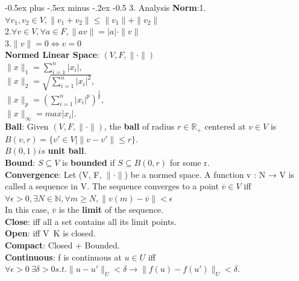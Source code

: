 \documentclass[10pt,landscape]{article}
\makeatletter
\renewcommand{\section}{\@startsection{section}{1}{0mm}%
                                {-0.5ex plus -.5ex minus -.2ex}%
                                {-0.5\baselineskip}%
                                {\normalfont\small\bfseries}}
\makeatother
\begin{document}
\begin{multicols*}{4}
\section{3. Analysis}
\textbf{Norm}:1.$\forall v_1,v_2 \in V, \parallel v_1+v_2 \parallel \leq \parallel v_1 \parallel + \parallel v_2 \parallel$\\
2.$\forall v \in V, \forall a \in F, \parallel av \parallel =|a| \cdot \parallel v \parallel$\\
3.$\parallel v \parallel = 0 \Leftrightarrow v=0$\\
\textbf{Normed Linear Space}: $(V,F,\parallel \cdot \parallel)$\\
$\parallel x \parallel_1 = \sum_{i=1}^{n} |x_i|,$\\
$\parallel x \parallel_2 = \sqrt{\sum_{i=1}^{n} |x_i|^2},$\\
$\parallel x \parallel_p = (\sum_{i=1}^{n} |x_i|^p)^{\frac{1}{p}},$\\
$\parallel x \parallel_\infty = max |x_i|.$\\

\textbf{Ball}: Given $(V,F,\parallel \cdot \parallel)$, the \textbf{ball} of radius $r \in \mathbb{R}_+$ centered at $v \in V$ is $B(v,r) = \{ v' \in V | \parallel v - v' \parallel \leq r\}$.\\
$B(0,1) is$ \textbf{unit ball}.\\
\textbf{Bound}: $S \subseteq V$ is \textbf{bounded} if $S \subseteq B(0,r)$ for some r.\\
\textbf{Convergence}: Let (V, F, $\parallel \cdot \parallel$) be a normed space. A function v : N → V is called a sequence in V. The sequence converges to a point $\overline{v} \in V$ iff $\forall \epsilon > 0, \exists N \in \mathbb{N}, \forall m \geq N, \parallel v(m)-\overline{v} \parallel < \epsilon$\\

In this case, $\overline{v}$ is the \textbf{limit} of the sequence.\\
\textbf{Close}: iff all a set contains all its limit points.\\
\textbf{Open}: iff V\ K is closed.\\

\textbf{Compact}: Closed + Bounded.\\

\textbf{Continuous}: f is continuous at $u \in U$ iff
$\forall \epsilon > 0\ \exists \delta >0 s.t. \parallel u-u' \parallel_U < \delta \rightarrow \parallel f(u)-f(u') \parallel_U < \delta $.

\end{multicols*}
\end{document}
